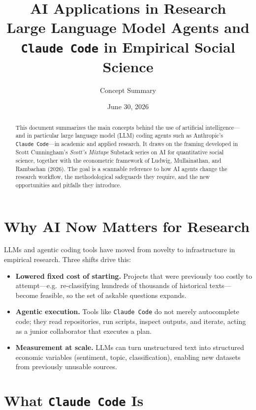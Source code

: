 \documentclass[11pt]{article}
\title{\textbf{AI Applications in Research}\\[0.3em]
\large Large Language Model Agents and \texttt{Claude Code} in Empirical Social Science}
\author{Concept Summary}
\date{June 30, 2026}
\begin{document}
\maketitle

\begin{abstract}
\noindent This document summarizes the main concepts behind the use of artificial
intelligence---and in particular large language model (LLM) coding agents such as
Anthropic's \texttt{Claude Code}---in academic and applied research. It draws on
the framing developed in Scott Cunningham's \emph{Scott's Mixtape} Substack series
on AI for quantitative social science, together with the econometric framework of
Ludwig, Mullainathan, and Rambachan (2026). The goal is a scannable reference to
how AI agents change the research workflow, the methodological safeguards they
require, and the new opportunities and pitfalls they introduce.
\end{abstract}

\section{Why AI Now Matters for Research}

LLMs and agentic coding tools have moved from novelty to infrastructure in
empirical research. Three shifts drive this:

\begin{itemize}
  \item \textbf{Lowered fixed cost of starting.} Projects that were previously too
        costly to attempt---e.g.\ re-classifying hundreds of thousands of historical
        texts---become feasible, so the set of askable questions expands.
  \item \textbf{Agentic execution.} Tools like \texttt{Claude Code} do not merely
        autocomplete code; they read repositories, run scripts, inspect outputs,
        and iterate, acting as a junior collaborator that executes a plan.
  \item \textbf{Measurement at scale.} LLMs can turn unstructured text into
        structured economic variables (sentiment, topic, classification), enabling
        new datasets from previously unusable sources.
\end{itemize}

\section{What \texttt{Claude Code} Is}
\end{document}
